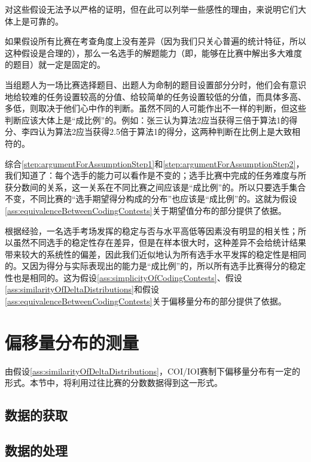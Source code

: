         对这些假设无法予以严格的证明，但在此可以列举一些感性的理由，来说明它们大体上是可靠的。

        \begin{asparaenum}
            \item \label{step:argumentForAssumptionStep1} 如果假设所有比赛在考查角度上没有差异（因为我们只关心普遍的统计特征，所以这种假设是合理的），那么一名选手的解题能力（即，能够在比赛中解出多大难度的题目）就一定是固定的。
            \item \label{step:argumentForAssumptionStep2} 当组题人为一场比赛选择题目、出题人为命制的题目设置部分分时，他们会有意识地给较难的任务设置较高的分值、给较简单的任务设置较低的分值，而具体多高、多低，则取决于他们心中作的判断。虽然不同的人可能作出不一样的判断，但这些判断应该大体上是“成比例”的。例如：张三认为算法2应当获得三倍于算法1的得分、李四认为算法2应当获得2.5倍于算法1的得分，这两种判断在比例上是大致相符的。
            \item 综合\ref{step:argumentForAssumptionStep1}和\ref{step:argumentForAssumptionStep2}，我们知道了：每个选手的能力可以看作是不变的；选手比赛中完成的任务难度与所获分数间的关系，这一关系在不同比赛之间应该是“成比例”的。所以只要选手集合不变，不同比赛的“选手期望得分构成的分布”也应该是“成比例”的。这就为假设\ref{ass:equivalenceBetweenCodingContests}关于期望值分布的部分提供了依据。
            \item 根据经验，一名选手考场发挥的稳定与否与水平高低等因素没有明显的相关性；所以虽然不同选手的稳定性存在差异，但是在样本很大时，这种差异不会给统计结果带来较大的系统性的偏差，因此我们近似地认为所有选手水平发挥的稳定性是相同的。又因为得分与实际表现出的能力是“成比例”的，所以所有选手比赛得分的稳定性也是相同的。这为假设\ref{ass:simplicityOfCodingContests}、假设\ref{ass:similarityOfDeltaDistributions}和假设\ref{ass:equivalenceBetweenCodingContests}关于偏移量分布的部分提供了依据。
        \end{asparaenum}

\section{偏移量分布的测量}

    由假设\ref{ass:similarityOfDeltaDistributions}，COI/IOI赛制下偏移量分布有一定的形式。本节中，将利用过往比赛的分数数据得到这一形式。

    \subsection{数据的获取}

    \subsection{数据的处理}